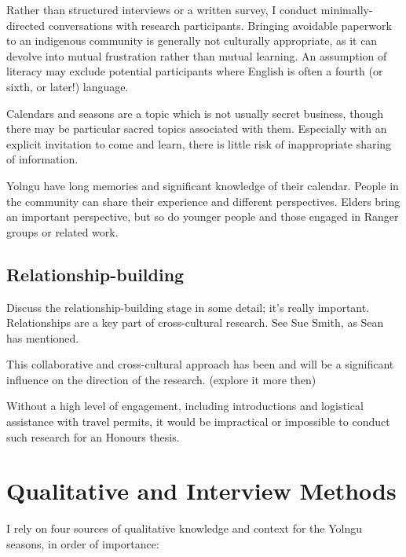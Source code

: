 Rather than structured interviews or a written survey, I conduct minimally-
directed conversations with research participants.  Bringing avoidable 
paperwork to an indigenous community is generally not culturally appropriate, 
as it can devolve into mutual frustration rather than mutual learning.  An 
assumption of literacy may exclude potential participants where English is 
often a fourth (or sixth, or later!) language.

Calendars and seasons are a topic which is not usually secret business, though 
there may be particular sacred topics associated with them.  Especially with an 
explicit invitation to come and learn, there is little risk of inappropriate 
sharing of information.

Yolngu have long memories and significant knowledge of their 
calendar.  People in the community can share their experience and different 
perspectives.  Elders bring an important perspective, but so do younger people 
and those engaged in Ranger groups or related work.


\subsection{Relationship-building}
Discuss the relationship-building stage in some detail; it's really important.
Relationships are a key part of cross-cultural research.  See Sue Smith, as 
Sean has mentioned.

This collaborative and cross-cultural approach has been and will be a 
significant influence on the direction of the research. (explore it more then)

Without a high level of engagement, including introductions and logistical
assistance with travel permits, it would be impractical or impossible to conduct
such research for an Honours thesis.



\section{Qualitative and Interview Methods}

I rely on four sources of qualitative knowledge and context for the Yolngu
seasons, in order of importance:

